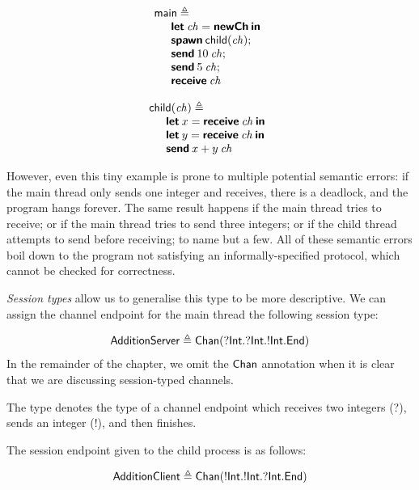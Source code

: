 \documentclass[
graybox,
envcountchap
]{svmult}
\begin{document}
\begin{bibunit}
  \begin{minipage}{0.45\textwidth}
  \[
    \begin{array}{l}
    \mathsf{main} \triangleq \\
    \quad
      \begin{array}{l}
        \textbf{\textsf{let}} \: \mathit{ch} = \textbf{\textsf{newCh}} \: \textbf{\textsf{in}} \\
        \textbf{\textsf{spawn}} \: \mathsf{child}(\mathit{ch}); \\
        \textbf{\textsf{send}} \: 10 \: \mathit{ch}; \\
        \textbf{\textsf{send}} \: 5 \: \mathit{ch}; \\
        \textbf{\textsf{receive}} \: \mathit{ch}
      \end{array}
    \end{array}
  \]
\end{minipage}
\hfill
\begin{minipage}{0.45\textwidth}
  \[
    \begin{array}{l}
    \mathsf{child}(\mathit{ch}) \triangleq \\
    \quad
      \begin{array}{l}
      \textbf{\textsf{let}} \: x = \textbf{\textsf{receive}} \: \mathit{ch} \: \textbf{\textsf{in}} \\
      \textbf{\textsf{let}} \: y = \textbf{\textsf{receive}} \: \mathit{ch} \: \textbf{\textsf{in}} \\
      \textbf{\textsf{send}} \: x + y \: \mathit{ch}
      \end{array}
    \end{array}
  \]
\end{minipage}


  However, even this tiny example is prone to multiple potential semantic errors: if the
  main thread only sends one integer and receives, there is a deadlock, and the
  program hangs forever. The same result happens if the main thread tries to
  receive; or if the main thread tries to send three integers; or if the child
  thread attempts to send before receiving; to name but a few. All of these
  semantic errors boil down to the program not satisfying an
  informally-specified protocol, which cannot be checked for correctness.

  \emph{Session types} allow us to generalise this type to be more descriptive.
  We can assign the channel endpoint for the main thread the following session
  type:

  \[
    \mathsf{AdditionServer} \triangleq
    \mathsf{Chan}({?}\mathsf{Int}.{?}\mathsf{Int}.{!}\mathsf{Int}.\mathsf{End})
  \]
  In the remainder of the chapter, we omit the $\mathsf{Chan}$ annotation when it
  is clear that we are discussing session-typed channels.

  The  type denotes the type of a channel endpoint which
  receives two integers (?), sends an integer (!), and then finishes.

  The session endpoint given to the child process is as follows:

  \[
    \mathsf{AdditionClient} \triangleq
    \mathsf{Chan}({!}\mathsf{Int}.{!}\mathsf{Int}.{?}\mathsf{Int}.\mathsf{End})
  \]


\end{bibunit}
\end{document}
